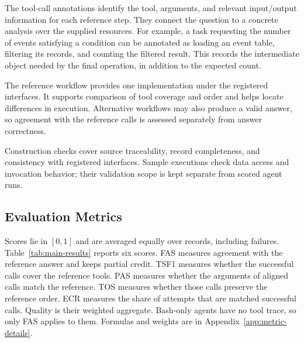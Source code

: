 The tool-call annotations identify the tool, arguments, and relevant input/output information for each reference step. They connect the question to a concrete analysis over the supplied resources. For example, a task requesting the number of events satisfying a condition can be annotated as loading an event table, filtering its records, and counting the filtered result. This records the intermediate object needed by the final operation, in addition to the expected count.

The reference workflow provides one implementation under the registered interfaces. It supports comparison of tool coverage and order and helps locate differences in execution. Alternative workflows may also produce a valid answer, so agreement with the reference calls is assessed separately from answer correctness.

Construction checks cover source traceability, record completeness, and consistency with registered interfaces. Sample executions check data access and invocation behavior; their validation scope is kept separate from scored agent runs.

\subsection{Evaluation Metrics}
\label{sec:metrics}
Scores lie in $[0,1]$ and are averaged equally over records, including failures. Table~\ref{tab:main-results} reports six scores. FAS measures agreement with the reference answer and keeps partial credit. TSF1 measures whether the successful calls cover the reference tools. PAS measures whether the arguments of aligned calls match the reference. TOS measures whether those calls preserve the reference order. ECR measures the share of attempts that are matched successful calls. Quality is their weighted aggregate. Bash-only agents have no tool trace, so only FAS applies to them. Formulas and weights are in Appendix~\ref{app:metric-details}.
